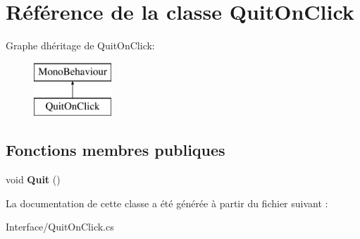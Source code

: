 \hypertarget{class_quit_on_click}{}\section{Référence de la classe Quit\+On\+Click}
\label{class_quit_on_click}
Graphe d\textquotesingle{}héritage de Quit\+On\+Click\+:\begin{figure}[H]
\begin{center}
\leavevmode
\includegraphics[height=2.000000cm]{class_quit_on_click}
\end{center}
\end{figure}
\subsection*{Fonctions membres publiques}
\begin{DoxyCompactItemize}
\item 
\mbox{\label{class_quit_on_click_a2ae4a389fc44a04218d7a1353bcc870a}} 
void {\bfseries Quit} ()
\end{DoxyCompactItemize}


La documentation de cette classe a été générée à partir du fichier suivant \+:\begin{DoxyCompactItemize}
\item 
Interface/Quit\+On\+Click.\+cs\end{DoxyCompactItemize}
